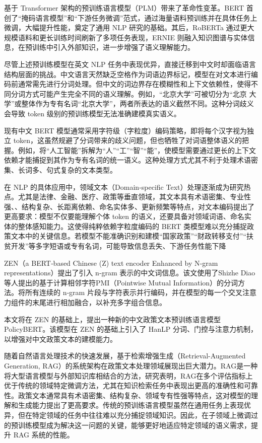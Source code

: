 \documentclass[12pt, a4paper]{ctexart}
\begin{document}
基于 Transformer 架构的预训练语言模型（PLM）带来了革命性变革。BERT 首创了“掩码语言模型”和“下游任务微调”范式，通过海量语料预训练并在具体任务上微调，大幅提升性能，奠定了通用 NLP 研究的基础\cite{devlin-etal-2019-bert}。其后，RoBERTa 通过更大规模语料和更长训练时间刷新了多项任务表现\cite{liu2019robertarobustlyoptimizedbert}，ERNIE 则融入知识图谱与实体信息，在预训练中引入外部知识，进一步增强了语义理解能力\cite{sun2019ernieenhancedrepresentationknowledge}。

尽管上述预训练模型在英文 NLP 任务中表现优异，直接迁移到中文时却面临语言结构层面的挑战。中文语言天然缺乏空格作为词语边界标记，模型在对文本进行编码前通常需先进行分词处理。但中文的词边界存在模糊性和上下文依赖性，使得不同分词方式可能产生完全不同的语义理解。例如，“北京大学”可被切分为“北京 大学”或整体作为专有名词“北京大学”，两者所表达的语义截然不同。这种分词歧义会导致 token 级别的预训练模型无法准确建模真实语义。

现有中文 BERT 模型通常采用字符级（字粒度）编码策略，即将每个汉字视为独立 token，这虽然规避了分词带来的歧义问题，但也牺牲了对词语整体语义的把握。例如，将“人工智能”拆解为“人”“工”“智”“能”，使模型需要通过更长的上下文依赖才能捕捉到其作为专有名词的统一语义。这种处理方式尤其不利于处理术语密集、长词多、句式复杂的文本类型。

在 NLP 的具体应用中，领域文本（Domain-specific Text）处理逐渐成为研究热点。尤其是法律、金融、医疗、政策等垂直领域，其文本具有术语密集、专业性强、、结构复杂、长距离依赖、命名实体多、更新频繁等特点，对文本编码提出了更高要求：模型不仅要能理解个体 token 的语义，还要具备对领域词语、命名实体的整体感知能力。这使得纯粹依赖字粒度编码的 BERT 类模型难以充分捕捉政策文本中的关键信息。若模型不能准确识别和建模“国家政策”“财政转移支付”“扶贫开发”等多字短语或专有名词，可能导致信息丢失、下游任务性能下降

ZEN（a BERT‑based Chinese (Z) text encoder Enhanced by N‑gram representations）提出了引入 n‑gram 表示的中文词信息\cite{diao-etal-2020-zen}。该文使用了Shizhe Diao 等人提出的基于计算相邻字符PMI（Pointwise Mutual Information）的分词方法\cite{DXSJSZ2021}。将所有连续的 n‑gram 片段与字符表示并行编码，并在模型的每一个交叉注意力组件的末尾进行相加融合，以补充多字组合信息。

本文将在 ZEN 的基础上，提出一种新的中文政策文本预训练语言模型 PolicyBERT。该模型在 ZEN 的基础上引入了 HanLP 分词、门控与注意力机制，以增强对中文政策文本的建模能力。

\vspace{2em} %

随着自然语言处理技术的快速发展，基于检索增强生成（Retrieval-Augmented Generation, RAG）的系统架构在政策文本处理领域展现出巨大潜力。RAG是一种将大型语言模型与外部知识库相结合的方法，研究表明，RAG在多个评估指标上优于传统的领域特定微调方法，尤其在知识检索任务中表现出更高的准确性和可靠性\cite{lakatos2024investigatingperformanceretrievalaugmentedgeneration}。政策文本通常具有术语密集、结构复杂、领域专有性强等特点，这对模型的理解和生成能力提出了更高要求。传统的预训练语言模型虽然在通用任务上表现优异，但在特定领域的任务中往往难以充分捕捉领域知识。因此，在子领域上微调过的预训练模型成为解决这一问题的关键，能够更好地适应特定领域的语义需求，提升 RAG 系统的性能。
\end{document}
